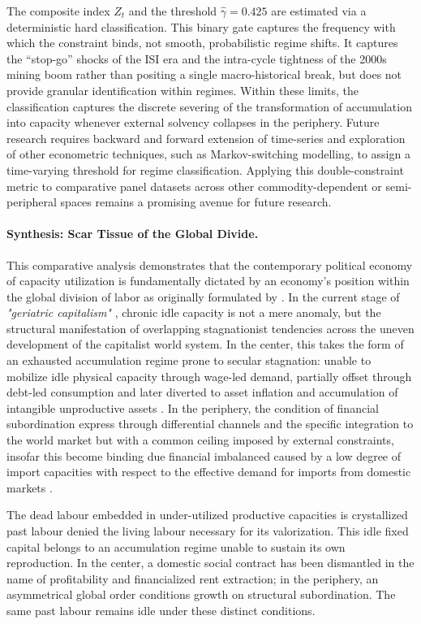The composite index $Z_t$ and the threshold $\hat{\gamma} = 0.425$ are estimated via a deterministic hard classification. This binary gate captures the frequency with which the constraint binds, not smooth, probabilistic regime shifts. It captures the ``stop-go'' shocks of the ISI era and the intra-cycle tightness of the 2000s mining boom rather than positing a single macro-historical break, but does not provide granular identification within regimes. Within these limits, the classification captures the discrete severing of the transformation of accumulation into capacity whenever external solvency collapses in the periphery. Future research requires backward and forward extension of time-series and exploration of other econometric techniques, such as Markov-switching modelling, to assign a time-varying threshold for regime classification. Applying this double-constraint metric to comparative panel datasets across other commodity-dependent or semi-peripheral spaces remains a promising avenue for future research.

\paragraph{Synthesis: Scar Tissue of the Global Divide.}
This comparative analysis demonstrates that the contemporary political economy of capacity utilization is fundamentally dictated by an economy's position within the global division of labor as originally formulated by \citet{Prebisch1981}. In the current stage of \textit{"geriatric capitalism"} \citep{Vidal2019}, chronic idle capacity is not a mere anomaly, but the structural manifestation of overlapping stagnationist tendencies across the uneven development of the capitalist world system. In the center, this takes the form of an exhausted accumulation regime prone to secular stagnation: unable to mobilize idle physical capacity through wage-led demand, partially offset through debt-led consumption and later diverted to asset inflation and accumulation of intangible unproductive assets \citep{Rotta2018, Rikap2021}. In the periphery, the condition of financial subordination express through differential channels and the specific integration to the world market but with a common ceiling imposed by external constraints, insofar this become binding due financial imbalanced caused by a low degree of import capacities with respect to the effective demand for imports from domestic markets \citep{McCombieThirwall1994}.

The dead labour embedded in under-utilized productive capacities is crystallized past labour denied the living labour necessary for its valorization. This idle fixed capital belongs to an accumulation regime unable to sustain its own reproduction. In the center, a domestic social contract has been dismantled in the name of profitability and financialized rent extraction; in the periphery, an asymmetrical global order conditions growth on structural subordination. The same past labour remains idle under these distinct conditions.